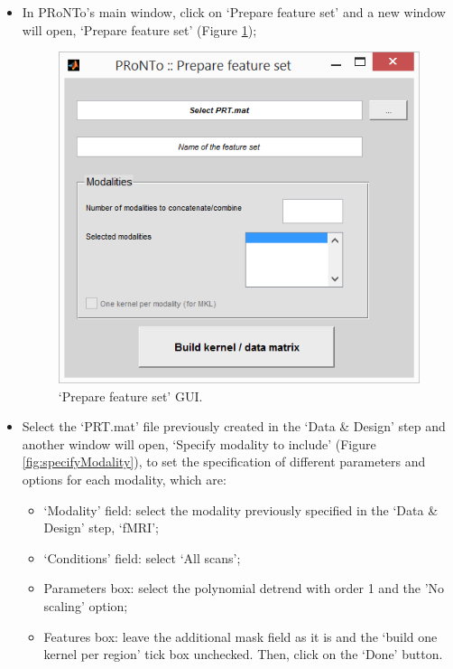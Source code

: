 \begin{itemize}
	
	\item In PRoNTo's main window, click on `Prepare feature set' and a new window will open, `Prepare feature set' (Figure \ref{fig:prepareFeature});
	
	\begin{figure}[!h]
	\centering
		\includegraphics[scale=0.7]{images/Tutorial/classification/prepareFeature.png}
	\caption{`Prepare feature set' GUI.}
	\label{fig:prepareFeature}
\end{figure}
	
	\item Select the `PRT.mat' file previously created in the `Data \& Design' step and another window will open, `Specify modality to include' (Figure \ref{fig:specifyModality}), to set the specification of different parameters and options for each modality, which are: 
	
	\begin{itemize}
		\item `Modality' field: select the modality previously specified in the `Data \& Design' step, `fMRI';
		\item `Conditions' field: select `All scans'; 
		\item Parameters box: select the polynomial detrend with order 1 and the 'No scaling' option;
		\item Features box: leave the additional mask field as it is and the `build one kernel per region' tick box unchecked. Then, click on the `Done' button.  
		

\end{itemize}
\end{itemize}
